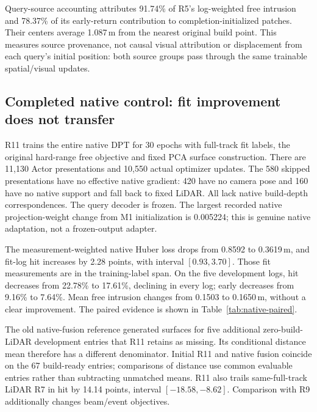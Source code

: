 \documentclass[10pt,a4paper]{article}
\begin{document}
Query-source accounting attributes 91.74\% of R5's log-weighted free intrusion
and 78.37\% of its early-return contribution to completion-initialized patches.
Their centers average 1.087\,m from the nearest original build point. This
measures source provenance, not causal visual attribution or displacement
from each query's initial position: both source groups pass through the same
trainable spatial/visual updates.

\subsection{Completed native control: fit improvement does not transfer}
R11 trains the entire native DPT for 30 epochs with full-track fit labels,
the original hard-range free objective and fixed PCA surface construction.
There are 11,130 Actor presentations and 10,550 actual optimizer updates.
The 580 skipped presentations have no effective native gradient: 420 have no
camera pose and 160 have no native support and fall back to fixed LiDAR.
All lack native build-depth correspondences. The query decoder is frozen.
The largest recorded native projection-weight change from M1 initialization
is 0.005224; this is genuine native adaptation, not a frozen-output adapter.

The measurement-weighted native Huber loss drops from 0.8592 to 0.3619\,m,
and fit-log hit increases by 2.28 points, with interval $[0.93,3.70]$.
Those fit measurements are in the training-label span. On the five
development logs, hit decreases from 22.78\% to 17.61\%, declining in every
log; early decreases from 9.16\% to 7.64\%. Mean free intrusion changes from
0.1503 to 0.1650\,m, without a clear improvement. The paired evidence is
shown in Table~\ref{tab:native-paired}.

\begin{table}[htbp]
\centering\small

\caption{Native R11 final minus its own initialization on five development
logs, with existing 10,000-resample log-bootstrap intervals (seed 7304).
Improvement means higher hit/recall or lower early/miss/free/distance.
The one-way distance is conditional on common evaluable support.}
\label{tab:native-paired}
\end{table}

The old native-fusion reference generated surfaces for five additional
zero-build-LiDAR development entries that R11 retains as missing. Its
conditional distance mean therefore has a different denominator. Initial
R11 and native fusion coincide on the 67 build-ready entries; comparisons of
distance use common evaluable entries rather than subtracting unmatched means.
R11 also trails same-full-track LiDAR R7 in hit by 14.14 points, interval
$[-18.58,-8.62]$. Comparison with R9 additionally changes beam/event objectives.
\end{document}
